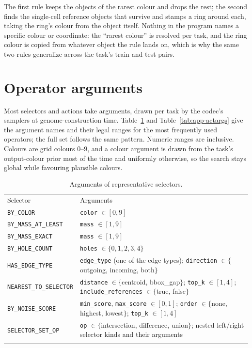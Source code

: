 \noindent The first rule keeps the objects of the rarest colour and drops the rest; the
second finds the single-cell reference objects that survive and stamps a ring around each,
taking the ring's colour from the object itself. Nothing in the program names a specific
colour or coordinate: the ``rarest colour'' is resolved per task, and the ring colour is
copied from whatever object the rule lands on, which is why the same two rules generalize
across the task's train and test pairs.

\section{Operator arguments}
\label{app:opargs}

Most selectors and actions take arguments, drawn per task by the codec's samplers at
genome-construction time. Table~\ref{tab:app-selargs} and Table~\ref{tab:app-actargs} give
the argument names and their legal ranges for the most frequently used operators; the full
set follows the same pattern. Numeric ranges are inclusive. Colours are grid colours
$0$--$9$, and a colour argument is drawn from the task's output-colour prior most of the
time and uniformly otherwise, so the search stays global while favouring plausible colours.

\begin{table}[htbp]
\centering
\caption{Arguments of representative selectors.}
\label{tab:app-selargs}
\small
\begin{tabular}{p{4.6cm}p{8.4cm}}
\hline\noalign{\smallskip}
Selector & Arguments \\
\noalign{\smallskip}\hline\noalign{\smallskip}
\texttt{BY\_COLOR} & \texttt{color} $\in [0,9]$ \\
\texttt{BY\_MASS\_AT\_LEAST} & \texttt{mass} $\in [1,9]$ \\
\texttt{BY\_MASS\_EXACT} & \texttt{mass} $\in [1,9]$ \\
\texttt{BY\_HOLE\_COUNT} & \texttt{holes} $\in \{0,1,2,3,4\}$ \\
\texttt{HAS\_EDGE\_TYPE} & \texttt{edge\_type} (one of the edge types); \texttt{direction} $\in \{$outgoing, incoming, both$\}$ \\
\texttt{NEAREST\_TO\_SELECTOR} & \texttt{distance} $\in \{$centroid, bbox\_gap$\}$; \texttt{top\_k} $\in [1,4]$; \texttt{include\_references} $\in \{$true, false$\}$ \\
\texttt{BY\_NOISE\_SCORE} & \texttt{min\_score}, \texttt{max\_score} $\in [0,1]$; \texttt{order} $\in \{$none, highest, lowest$\}$; \texttt{top\_k} $\in [1,4]$ \\
\texttt{SELECTOR\_SET\_OP} & \texttt{op} $\in \{$intersection, difference, union$\}$; nested left/right selector kinds and their arguments \\
\noalign{\smallskip}\hline
\end{tabular}
\end{table}

